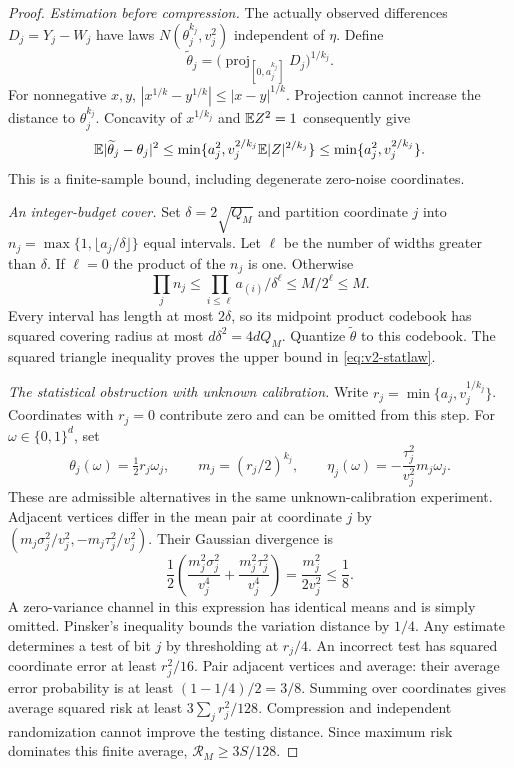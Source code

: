 \begin{proof}
\emph{Estimation before compression.}
The actually observed differences $D_j=Y_j-W_j$ have laws
$N(\theta_j^{k_j},v_j^2)$ independent of $\eta$. Define
\[
 \widetilde\theta_j=
  \bigl(\operatorname{proj}_{[0,a_j^{k_j}]}D_j\bigr)^{1/k_j}.
\]
For nonnegative $x,y$, $|x^{1/k}-y^{1/k}|\le|x-y|^{1/k}$.
Projection cannot increase the distance to $\theta_j^{k_j}$.
Concavity of $x^{1/k_j}$ and $\mathbb E Z^2=1$ consequently give
\[
 \mathbb E|\widetilde\theta_j-\theta_j|^2
 \le\min\{a_j^2,v_j^{2/k_j}\mathbb E|Z|^{2/k_j}\}
 \le\min\{a_j^2,v_j^{2/k_j}\}.
\]
This is a finite-sample bound, including degenerate zero-noise coordinates.

\emph{An integer-budget cover.}
Set $\delta=2\sqrt{Q_M}$ and partition coordinate $j$ into
$n_j=\max\{1,\lfloor a_j/\delta\rfloor\}$ equal intervals.
Let $\ell$ be the number of widths greater than $\delta$.
If $\ell=0$ the product of the $n_j$ is one. Otherwise
\[
 \prod_jn_j\le\prod_{i\le\ell}a_{(i)}/\delta^\ell
 \le M/2^\ell\le M.
\]
Every interval has length at most $2\delta$, so its midpoint product
codebook has squared covering radius at most $d\delta^2=4dQ_M$.
Quantize $\widetilde\theta$ to this codebook. The squared triangle
inequality proves the upper bound in \eqref{eq:v2-statlaw}.

\emph{The statistical obstruction with unknown calibration.}
Write $r_j=\min\{a_j,v_j^{1/k_j}\}$. Coordinates with $r_j=0$ contribute
zero and can be omitted from this step. For $\omega\in\{0,1\}^d$, set
\[
 \theta_j(\omega)=\tfrac12r_j\omega_j,\qquad
 m_j=(r_j/2)^{k_j},\qquad
 \eta_j(\omega)=-\frac{\tau_j^2}{v_j^2}m_j\omega_j.
\]
These are admissible alternatives in the same unknown-calibration
experiment. Adjacent vertices differ in the mean pair at coordinate $j$
by $(m_j\sigma_j^2/v_j^2,-m_j\tau_j^2/v_j^2)$.
Their Gaussian divergence is
\[
 \frac12\left(\frac{m_j^2\sigma_j^2}{v_j^4}
             +\frac{m_j^2\tau_j^2}{v_j^4}\right)
 =\frac{m_j^2}{2v_j^2}\le\frac18.
\]
A zero-variance channel in this expression has identical means and is
simply omitted. Pinsker's inequality bounds the variation distance by
$1/4$. Any estimate determines a test of bit $j$ by thresholding at
$r_j/4$. An incorrect test has squared coordinate error at least
$r_j^2/16$. Pair adjacent vertices and average: their average error
probability is at least $(1-1/4)/2=3/8$. Summing over coordinates gives
average squared risk at least $3\sum_jr_j^2/128$. Compression and
independent randomization cannot improve the testing distance. Since
maximum risk dominates this finite average, $\mathcal R_M\ge3S/128$.


\end{proof}
